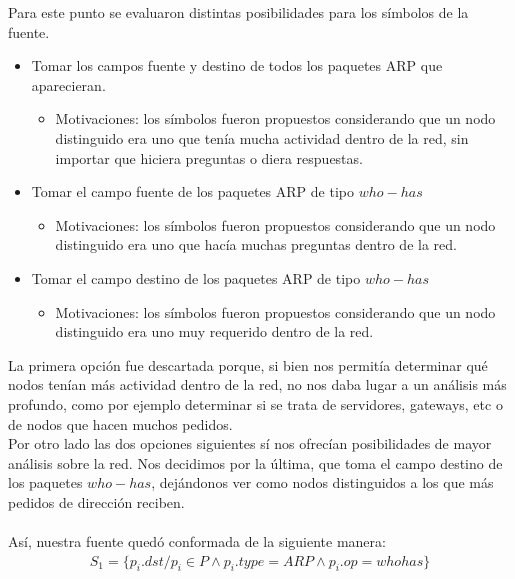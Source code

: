 Para este punto se evaluaron distintas posibilidades para los s\'imbolos de la fuente.\\
\begin{itemize}
\item Tomar los campos fuente y destino de todos los paquetes ARP que aparecieran.
\begin{itemize}
\item Motivaciones: los s\'imbolos fueron propuestos considerando que un nodo distinguido era uno que ten\'ia mucha actividad dentro de la red, sin importar que hiciera preguntas o diera respuestas.
\end{itemize}
\item Tomar el campo fuente de los paquetes ARP de tipo $who-has$
\begin{itemize}
\item Motivaciones: los s\'imbolos fueron propuestos considerando que un nodo distinguido era uno que hac\'ia muchas preguntas dentro de la red.
\end{itemize}
\item Tomar el campo destino de los paquetes ARP de tipo $who-has$
\begin{itemize}
\item Motivaciones: los s\'imbolos fueron propuestos considerando que un nodo distinguido era uno muy requerido dentro de la red.
\end{itemize}
\end{itemize}
\vspace{0.5cm}  

La primera opci\'on fue descartada porque, si bien nos permit\'ia determinar qu\'e nodos ten\'ian m\'as actividad dentro de la red, no nos daba lugar a un an\'alisis m\'as profundo, como por ejemplo determinar si se trata de servidores, gateways, etc o de nodos que hacen muchos pedidos. \\
Por otro lado las dos opciones siguientes s\'i nos ofrec\'ian posibilidades de mayor an\'alisis sobre la red. Nos decidimos por la \'ultima, que toma el campo destino de los paquetes $who-has$, dej\'andonos ver como nodos distinguidos a los que m\'as pedidos de direcci\'on reciben.\\\\

As\'i, nuestra fuente qued\'o conformada de la siguiente manera:\\
\begin{gather*}
S_1 =  \{ p_{i}.dst / p_{i} \in P \wedge  p_{i}.type = ARP \wedge p_{i}.op = whohas \}
\end{gather*}
\vspace{0.5cm}


